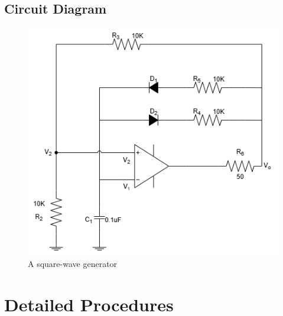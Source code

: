     \subsection{Circuit Diagram}
    \begin{figure}[h]
        \centering
        \includegraphics[width=0.65\linewidth]{Lab15/Lab15.drawio.png}
        \caption{A square-wave generator}
        \label{lab15f}
    \end{figure}
    \FloatBarrier

\section{Detailed Procedures}
